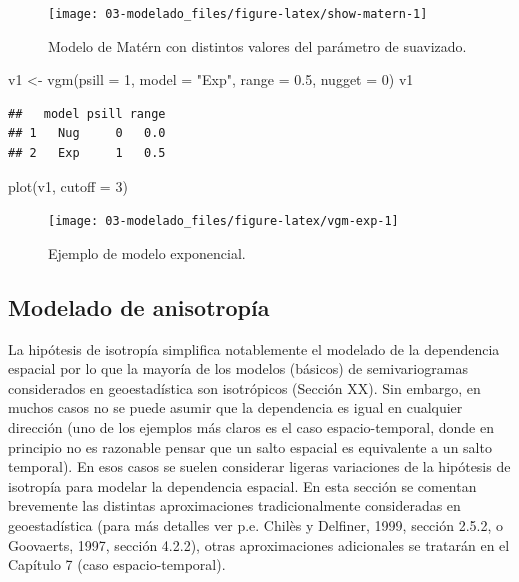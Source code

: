 \documentclass[
  spanish,
]{book}
\newenvironment{Shaded}{\begin{snugshade}}{\end{snugshade}}
\newcommand{\AttributeTok}[1]{\textcolor[rgb]{0.77,0.63,0.00}{#1}}
\newcommand{\DecValTok}[1]{\textcolor[rgb]{0.00,0.00,0.81}{#1}}
\newcommand{\FloatTok}[1]{\textcolor[rgb]{0.00,0.00,0.81}{#1}}
\newcommand{\FunctionTok}[1]{\textcolor[rgb]{0.00,0.00,0.00}{#1}}
\newcommand{\NormalTok}[1]{#1}
\newcommand{\OtherTok}[1]{\textcolor[rgb]{0.56,0.35,0.01}{#1}}
\newcommand{\StringTok}[1]{\textcolor[rgb]{0.31,0.60,0.02}{#1}}
\theoremstyle{break}
\theoremstyle{definition}
\theoremstyle{definition}
\theoremstyle{definition}
\theoremstyle{definition}
\theoremstyle{remark}
\begin{document}
\begin{figure}[!htb]

{\centering \texttt{[image: 03-modelado\_files/figure-latex/show-matern-1]} 

}

\caption{Modelo de Matérn con distintos valores del parámetro de suavizado.}\label{fig:show-matern}
\end{figure}

\begin{Shaded}
\begin{Highlighting}[]
\NormalTok{v1 }\OtherTok{\textless{}{-}} \FunctionTok{vgm}\NormalTok{(}\AttributeTok{psill =} \DecValTok{1}\NormalTok{, }\AttributeTok{model =} \StringTok{"Exp"}\NormalTok{, }\AttributeTok{range =} \FloatTok{0.5}\NormalTok{, }\AttributeTok{nugget =} \DecValTok{0}\NormalTok{)}
\NormalTok{v1}
\end{Highlighting}
\end{Shaded}

\begin{verbatim}
##   model psill range
## 1   Nug     0   0.0
## 2   Exp     1   0.5
\end{verbatim}

\begin{Shaded}
\begin{Highlighting}[]
\FunctionTok{plot}\NormalTok{(v1, }\AttributeTok{cutoff =} \DecValTok{3}\NormalTok{)}
\end{Highlighting}
\end{Shaded}

\begin{figure}[!htb]

{\centering \texttt{[image: 03-modelado\_files/figure-latex/vgm-exp-1]} 

}

\caption{Ejemplo de modelo exponencial.}\label{fig:vgm-exp}
\end{figure}

\hypertarget{anisotropia}{%
\subsection{Modelado de anisotropía}\label{anisotropia}}

La hipótesis de isotropía simplifica notablemente el modelado de la dependencia espacial por lo que la mayoría de los modelos (básicos) de semivariogramas considerados en geoestadística son isotrópicos (Sección XX).
Sin embargo, en muchos casos no se puede asumir que la dependencia es igual en cualquier dirección (uno de los ejemplos más claros es el caso espacio-temporal, donde en principio no es razonable pensar que un salto espacial es equivalente a un salto temporal).
En esos casos se suelen considerar ligeras variaciones de la hipótesis de isotropía para modelar la dependencia espacial.
En esta sección se comentan brevemente las distintas aproximaciones tradicionalmente consideradas en geoestadística (para más detalles ver p.e. Chilès y Delfiner, 1999, sección 2.5.2, o Goovaerts, 1997, sección 4.2.2), otras aproximaciones adicionales se tratarán en el Capítulo 7 (caso espacio-temporal).
\end{document}
